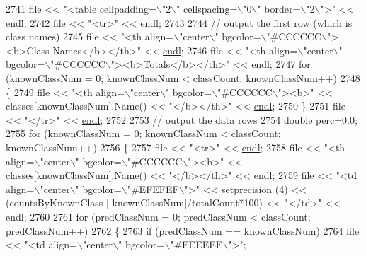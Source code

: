 \begin{DoxyCode}
{{2741   file  << \textcolor{stringliteral}{"<table cellpadding=\(\backslash\)"2\(\backslash\)" cellspacing=\(\backslash\)"0\(\backslash\)" border=\(\backslash\)"2\(\backslash\)">"} << \hyperlink{namespace_k_k_b_ad1f50f65af6adc8fa9e6f62d007818a8}{endl};
2742   file  << \textcolor{stringliteral}{"<tr>"} << \hyperlink{namespace_k_k_b_ad1f50f65af6adc8fa9e6f62d007818a8}{endl};
2743 
2744   \textcolor{comment}{// output the first row (which is class names)}
2745   file << \textcolor{stringliteral}{"<th align=\(\backslash\)"center\(\backslash\)" bgcolor=\(\backslash\)"#CCCCCC\(\backslash\)"><b>Class Names</b></th>"} << 
      \hyperlink{namespace_k_k_b_ad1f50f65af6adc8fa9e6f62d007818a8}{endl};
2746   file << \textcolor{stringliteral}{"<th align=\(\backslash\)"center\(\backslash\)" bgcolor=\(\backslash\)"#CCCCCC\(\backslash\)"><b>Totals</b></th>"} << \hyperlink{namespace_k_k_b_ad1f50f65af6adc8fa9e6f62d007818a8}{endl};
2747   \textcolor{keywordflow}{for}  (knownClassNum = 0;  knownClassNum < classCount;  knownClassNum++)
2748   \{
2749     file << \textcolor{stringliteral}{"<th align=\(\backslash\)"center\(\backslash\)" bgcolor=\(\backslash\)"#CCCCCC\(\backslash\)"><b>"} << classes[knownClassNum].Name() << \textcolor{stringliteral}{"</b></th>"} 
      << \hyperlink{namespace_k_k_b_ad1f50f65af6adc8fa9e6f62d007818a8}{endl};
2750   \}
2751   file  << \textcolor{stringliteral}{"</tr>"} << \hyperlink{namespace_k_k_b_ad1f50f65af6adc8fa9e6f62d007818a8}{endl};
2752 
2753   \textcolor{comment}{// output the data rows}
2754   \textcolor{keywordtype}{double} perc=0.0;
2755   \textcolor{keywordflow}{for}  (knownClassNum = 0;  knownClassNum < classCount;  knownClassNum++)
2756   \{
2757     file << \textcolor{stringliteral}{"<tr>"} << \hyperlink{namespace_k_k_b_ad1f50f65af6adc8fa9e6f62d007818a8}{endl};
2758     file << \textcolor{stringliteral}{"<th align=\(\backslash\)"center\(\backslash\)" bgcolor=\(\backslash\)"#CCCCCC\(\backslash\)"><b>"} << classes[knownClassNum].Name() << \textcolor{stringliteral}{"</b></th>"} 
      << \hyperlink{namespace_k_k_b_ad1f50f65af6adc8fa9e6f62d007818a8}{endl};
2759     file << \textcolor{stringliteral}{"<td align=\(\backslash\)"center\(\backslash\)" bgcolor=\(\backslash\)"#EFEFEF\(\backslash\)">"} << setprecision (4) << (countsByKnownClass [
      knownClassNum]/totalCount*100) << \textcolor{stringliteral}{"</td>"} << endl;
2760 
2761     \textcolor{keywordflow}{for}  (predClassNum = 0; predClassNum < classCount; predClassNum++)
2762     \{
2763       \textcolor{keywordflow}{if} (predClassNum == knownClassNum)
2764         file << \textcolor{stringliteral}{"<td align=\(\backslash\)"center\(\backslash\)" bgcolor=\(\backslash\)"#EEEEEE\(\backslash\)">"};
}}
\end{DoxyCode}
